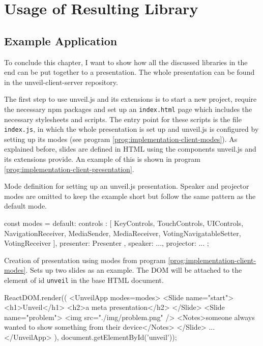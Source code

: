\chapter{Usage of Resulting Library}
\label{cha:usage}

\section{Example Application}
\label{sec:implementation-client}

To conclude this chapter, I want to show how all the discussed libraries in the end can be put together to a presentation. The whole presentation can be found in the unveil-client-server repository.

The first step to use unveil.js and its extensions is to start a new project, require the necessary npm packages and set up an \texttt{index.html} page which includes the necessary stylesheets and scripts.
The entry point for these scripts is the file \texttt{index.js}, in which the whole presentation is set up and unveil.js is configured by setting up its modes (see program \ref{prog:implementation-client-modes}). As explained before, slides are defined in HTML using the components unveil.js and its extensions provide. An example of this is shown in program \ref{prog:implementation-client-presentation}.

\begin{program}
\caption{Mode definition for setting up an unveil.js presentation. Speaker and projector modes are omitted to keep the example short but follow the same pattern as the default mode.}
\label{prog:implementation-client-modes}
\begin{JsCode}
const modes = {
  default: {
    controls : [
      KeyControls, TouchControls, UIControls,
      NavigationReceiver,
      MediaSender, MediaReceiver,
      VotingNavigatableSetter, VotingReceiver
    ],
    presenter: Presenter
  },
  speaker: {...},
  projector: {...}
};
\end{JsCode}
\end{program}

\begin{program}
\caption{Creation of presentation using modes from program \ref{prog:implementation-client-modes}. Sets up two slides as an example. The DOM will be attached to the element of id \texttt{unveil} in the base HTML document.}
\label{prog:implementation-client-presentation}
\begin{JsCode}
ReactDOM.render((
  <UnveilApp modes={modes}>
    <Slide name="start">
      <h1>Unveil</h1>
      <h2>a meta presentation</h2>
    </Slide>
    <Slide name="problem">
      <img src="./img/problem.png" />
      <Notes>someone always wanted to show something from their device</Notes>
    </Slide>
    ...
  </UnveilApp>
), document.getElementById('unveil'));
\end{JsCode}
\end{program}

